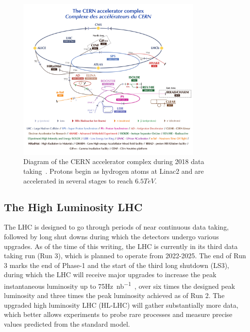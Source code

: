 \begin{figure}[htbp]
	\centering
	\includegraphics[width=0.825\textwidth]{figs/03_experiment/CCC-v2018-print-v2.pdf}
	\caption[Diagram of the CERN accelerator complex during 2018 data taking. Protons begin as hydrogen atoms at Linac2 and collide at various detectors along the LHC at $\sqrt{s}=13\unit{TeV}$]
	{Diagram of the CERN accelerator complex during 2018 data taking~\cite{Mobs:2636343}. Protons begin as hydrogen atoms at Linac2 and are accelerated in several stages to reach $6.5\unit{TeV}$.} 
	\label{fig:LHC}
\end{figure}

\subsection{The High Luminosity LHC} \label{sec:cms_hllhc}
The LHC is designed to go through periods of near continuous data taking, followed by long shut downs during which the detectors undergo various upgrades. As of the time of this writing, the LHC is currently in its third data taking run (Run 3), which is planned to operate from 2022-2025. The end of Run 3 marks the end of Phase-1 and the start of the third long shutdown (LS3), during which the LHC will receive major upgrades to increase the peak instantaneous luminosity up to 75\unit{\hertz\per nb}~\cite{CERN-LHCC-2020-004}, over six times the designed peak luminosity and three times the peak luminosity achieved as of Run 2. The upgraded high luminosity LHC (HL-LHC) will gather substantially more data, which better allows experiments to probe rare processes and measure precise values predicted from the standard model.

